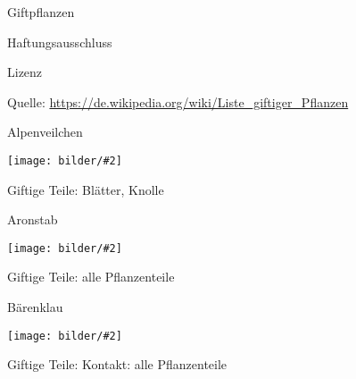 \documentclass[a1,portrait]{a0poster}
\newcommand{\pflanze}[3]{
#1
\begin{center}
\texttt{[image: bilder/\#2]}
\end{center}
Giftige Teile: #3
}
\begin{document}
\VERYHuge
\begin{center}
  Giftpflanzen
\end{center}
\normalsize

Haftungsausschluss

Lizenz

Quelle: \url{https://de.wikipedia.org/wiki/Liste_giftiger_Pflanzen}
\begin{multicols*}{5}

\pflanze{Alpenveilchen}{AlpenveilchenMessenien.ps}{Blätter, Knolle}

\pflanze{Aronstab}{Kreta-Aronstab.ps}{alle Pflanzenteile}

\pflanze{Bärenklau}{640px-Illustration_Heracleum_sphondylium0.ps}{Kontakt: alle Pflanzenteile}
\end{multicols*}
\end{document}
